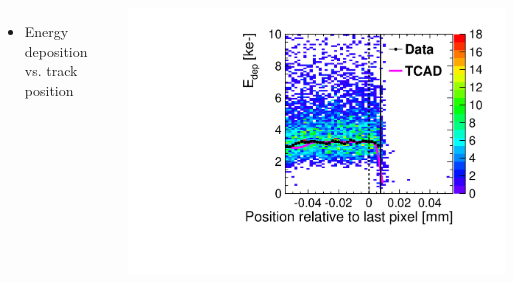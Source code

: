 \begin{frame}
\begin{columns}[t]
    \begin{itemize}
    \item Energy deposition vs. track position
    \end{itemize}
    \centering
    \includegraphics[width=\textwidth]{../figures/ActiveEdge/20_NGR_Edep_TCAD_data.pdf}

  \end{columns}

\end{frame}


